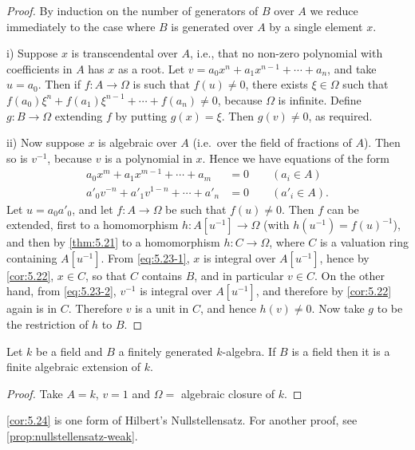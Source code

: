\begin{proof}
By induction on the number of generators of $B$ over $A$ we reduce immediately to the case where $B$ is generated over $A$ by a single element $x$.

i) Suppose $x$ is transcendental over $A$, i.e., that no non-zero polynomial with coefficients in $A$ has $x$ as a root. Let $v = a_0 x^n + a_1 x^{n-1} + \cdots + a_n$, and take $u = a_0$. Then if $f \colon A \to \Omega$ is such that $f(u) \neq 0$, there exists $\xi \in \Omega$ such that $f(a_0) \xi^n + f(a_1) \xi^{n-1} + \cdots + f(a_n) \neq 0$, because $\Omega$ is infinite. Define $g \colon B \to \Omega$ extending $f$ by putting $g(x) = \xi$. Then $g(v) \neq 0$, as required.

ii) Now suppose $x$ is algebraic over $A$ (i.e.~over the field of fractions of $A$). Then so is $v^{-1}$, because $v$ is a polynomial in $x$. Hence we have equations of the form
\begin{align}
a_0 x^m + a_1 x^{m-1} + \cdots + a_m &= 0 \qquad (a_i \in A) \label{eq:5.23-1}\tag{1} \\
a'_0 v^{-n} + a'_1 v^{1-n} + \cdots + a'_n &= 0 \qquad (a'_i \in A). \label{eq:5.23-2}\tag{2}
\end{align}
Let $u = a_0 a'_0$, and let $f \colon A \to \Omega$ be such that $f(u) \neq 0$. Then $f$ can be extended, first to a homomorphism $h \colon A[u^{-1}] \to \Omega$ (with $h(u^{-1}) = f(u)^{-1}$), and then by \eqref{thm:5.21} to a homomorphism $h \colon C \to \Omega$, where $C$ is a valuation ring containing $A[u^{-1}]$. From \eqref{eq:5.23-1}, $x$ is integral over $A[u^{-1}]$, hence by \eqref{cor:5.22}, $x \in C$, so that $C$ contains $B$, and in particular $v \in C$. On the other hand, from \eqref{eq:5.23-2}, $v^{-1}$ is integral over $A[u^{-1}]$, and therefore by \eqref{cor:5.22} again is in $C$. Therefore $v$ is a unit in $C$, and hence $h(v) \neq 0$. Now take $g$ to be the restriction of $h$ to $B$.
\end{proof}

\begin{corollary}\label{cor:5.24}
Let $k$ be a field and $B$ a finitely generated $k$-algebra. If $B$ is a field then it is a finite algebraic extension of $k$.
\end{corollary}

\begin{proof}
Take $A = k$, $v = 1$ and $\Omega =$ algebraic closure of $k$.
\end{proof}

\eqref{cor:5.24} is one form of Hilbert's Nullstellensatz. For another proof, see \eqref{prop:nullstellensatz-weak}.


